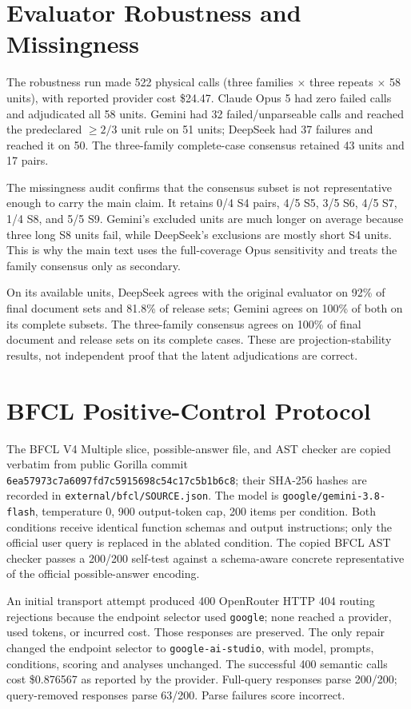 \documentclass{article}
\begin{document}
\section{Evaluator Robustness and Missingness}
\label{app:evaluator}
The robustness run made 522 physical calls (three families $\times$ three repeats $\times$ 58 units), with reported provider cost \$24.47. Claude Opus 5 had zero failed calls and adjudicated all 58 units. Gemini had 32 failed/unparseable calls and reached the predeclared $\ge2/3$ unit rule on 51 units; DeepSeek had 37 failures and reached it on 50. The three-family complete-case consensus retained 43 units and 17 pairs.

The missingness audit confirms that the consensus subset is not representative enough to carry the main claim. It retains 0/4 S4 pairs, 4/5 S5, 3/5 S6, 4/5 S7, 1/4 S8, and 5/5 S9. Gemini's excluded units are much longer on average because three long S8 units fail, while DeepSeek's exclusions are mostly short S4 units. This is why the main text uses the full-coverage Opus sensitivity and treats the family consensus only as secondary.

On its available units, DeepSeek agrees with the original evaluator on 92\% of final document sets and 81.8\% of release sets; Gemini agrees on 100\% of both on its complete subsets. The three-family consensus agrees on 100\% of final document and release sets on its complete cases. These are projection-stability results, not independent proof that the latent adjudications are correct.

\section{BFCL Positive-Control Protocol}
The BFCL V4 Multiple slice, possible-answer file, and AST checker are copied verbatim from public Gorilla commit \texttt{6ea57973c7a6097fd7c5915698c54c17c5b1b6c8}; their SHA-256 hashes are recorded in \texttt{external/bfcl/SOURCE.json}. The model is \texttt{google/gemini-3.8-flash}, temperature 0, 900 output-token cap, 200 items per condition. Both conditions receive identical function schemas and output instructions; only the official user query is replaced in the ablated condition. The copied BFCL AST checker passes a 200/200 self-test against a schema-aware concrete representative of the official possible-answer encoding.

An initial transport attempt produced 400 OpenRouter HTTP 404 routing rejections because the endpoint selector used \texttt{google}; none reached a provider, used tokens, or incurred cost. Those responses are preserved. The only repair changed the endpoint selector to \texttt{google-ai-studio}, with model, prompts, conditions, scoring and analyses unchanged. The successful 400 semantic calls cost \$0.876567 as reported by the provider. Full-query responses parse 200/200; query-removed responses parse 63/200. Parse failures score incorrect.
\end{document}
